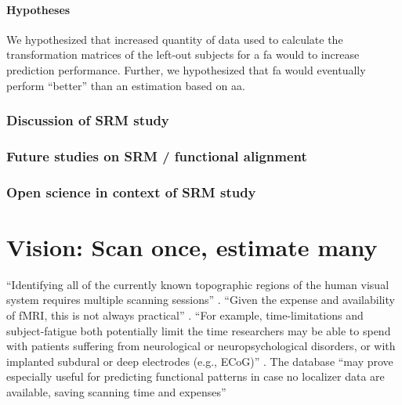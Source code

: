 \paragraph{Hypotheses}
%
We hypothesized that increased quantity of data used to calculate the
transformation matrices of the left-out subjects for a \ac{fa} would to increase
prediction performance.
%
Further, we hypothesized that \ac{fa} would eventually perform
``better'' than an estimation based on \ac{aa}.


\subsubsection{Discussion of SRM study}



\subsubsection{Future studies on SRM / functional alignment}



\subsubsection{Open science in context of SRM study}




\section{Vision: Scan once, estimate many}



``Identifying all of the currently known topographic regions of the human visual
system requires multiple scanning sessions'' \citep{wang2015probabilistic}.
%
``Given the expense and availability of fMRI, this is not always practical''
\citep{wang2015probabilistic}.
%
``For example, time-limitations and subject-fatigue both potentially limit the
time researchers may be able to spend with patients suffering from neurological
or neuropsychological disorders, or with implanted subdural or deep electrodes
(e.g., ECoG)'' \citep{wang2015probabilistic}.
%
The database ``may prove especially useful for predicting functional patterns in
case no localizer data are available, saving scanning time and expenses''
\citep{rosenke2021probabilistic}

